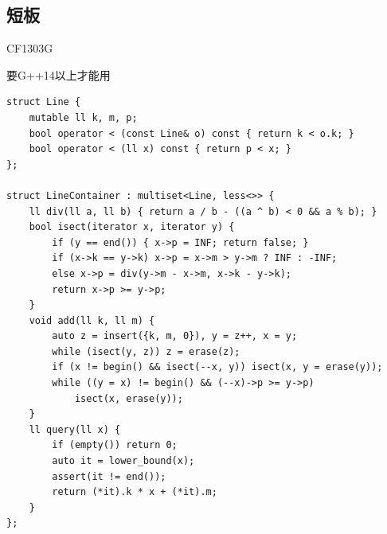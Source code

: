 \subsection{短板}
CF1303G\par
要G++14以上才能用\par
\begin{lstlisting}
struct Line {
	mutable ll k, m, p;
	bool operator < (const Line& o) const { return k < o.k; }
	bool operator < (ll x) const { return p < x; }
};

struct LineContainer : multiset<Line, less<>> {
	ll div(ll a, ll b) { return a / b - ((a ^ b) < 0 && a % b); }
	bool isect(iterator x, iterator y) {
		if (y == end()) { x->p = INF; return false; }
		if (x->k == y->k) x->p = x->m > y->m ? INF : -INF;
		else x->p = div(y->m - x->m, x->k - y->k);
		return x->p >= y->p;
	}
	void add(ll k, ll m) {
		auto z = insert({k, m, 0}), y = z++, x = y;
		while (isect(y, z)) z = erase(z);
		if (x != begin() && isect(--x, y)) isect(x, y = erase(y));
		while ((y = x) != begin() && (--x)->p >= y->p)
			isect(x, erase(y));
	}
	ll query(ll x) {
		if (empty()) return 0;
		auto it = lower_bound(x);
		assert(it != end());
		return (*it).k * x + (*it).m;
	}
};
\end{lstlisting}


